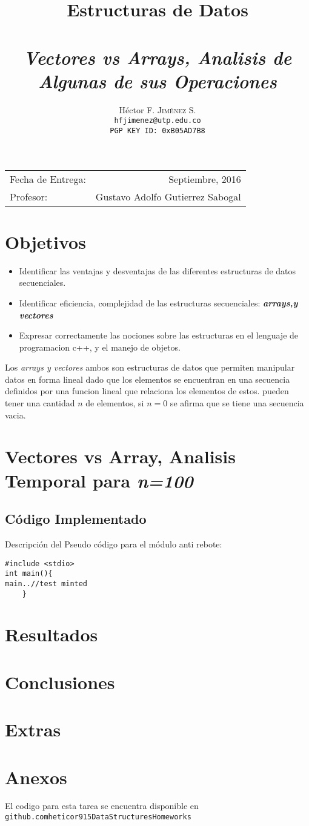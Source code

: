 \documentclass[paper=a4, fontsize=12pt]{article}        %
\title{Estructuras de Datos\\ 
\horrule{0.5pt} \\[0.4cm]                               %
\textit{Vectores vs Arrays, Analisis de Algunas de sus Operaciones}
\horrule{1pt} \\[0.5cm]             
}           %
\author{                                                %
Héctor F. \textsc{Jiménez S.}\\
\texttt{hfjimenez@utp.edu.co} \\
\texttt{PGP KEY ID: 0xB05AD7B8}}                                                       %
\date{}                                                %
\numberwithin{equation}{section}                        %
\numberwithin{table}{section}                           %
\begin{document}
\maketitle                                             %
\begin{center}
\begin{tabular}{l r}                                   %
Fecha de Entrega: & Septiembre, 2016 \\                %
Profesor: & Gustavo Adolfo Gutierrez Sabogal
\end{tabular}
\end{center}
\section{Objetivos}
\begin{itemize}
   \item Identificar las ventajas y desventajas de las diferentes estructuras de datos secuenciales.
  \item Identificar eficiencia, complejidad de las estructuras secuenciales: \textbf{\textit{arrays,y vectores}} 
  \item Expresar correctamente las nociones sobre las estructuras en el lenguaje de programacion c++, y el manejo de objetos.
\end{itemize}

Los \emph{arrays y vectores} ambos son estructuras de datos que permiten manipular datos en forma lineal dado que  los elementos se encuentran en una secuencia definidos por una funcion lineal que relaciona los elementos de estos. pueden tener una cantidad $n$ de elementos, si $n=0$ se afirma que se tiene una secuencia vacia. 

\section{Vectores vs Array, Analisis Temporal para \textit{n=100}}
\subsection{Código Implementado}
Descripción del Pseudo código para el módulo anti rebote:
\begin{verbatim}
#include <stdio>
int main(){
main..//test minted 
    }
\end{verbatim}

\section{Resultados}

\section{Conclusiones}

\section{Extras}
\section{Anexos}
El codigo para esta tarea se encuentra disponible en \texttt{github.com\/heticor915\/DataStructures\/Homeworks\/}
\end{document}
